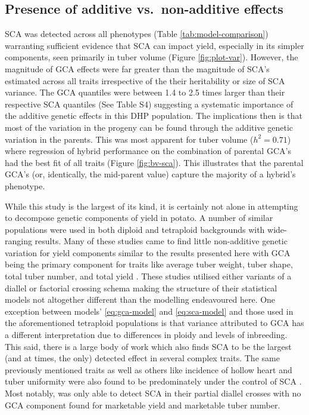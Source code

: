 \subsection{Presence of additive vs.~non-additive effects}\label{presence-of-additive-vs.-non-additive-effects}

SCA was detected across all phenotypes (Table \ref{tab:model-comparison}) warranting sufficient evidence that SCA can impact yield, especially in its simpler components, seen primarily in tuber volume (Figure \ref{fig:plot-var}). However, the magnitude of GCA effects were far greater than the magnitude of SCA's estimated across all traits irrespective of the their heritability or size of SCA variance. The GCA quantiles were between 1.4 to 2.5 times larger than their respective SCA quantiles (See Table S4) suggesting a systematic importance of the additive genetic effects in this DHP population. The implications then is that most of the variation in the progeny can be found through the additive genetic variation in the parents. This was most apparent for tuber volume (\(h^2 = 0.71\)) where regression of hybrid performance on the combination of parental GCA's had the best fit of all traits (Figure \ref{fig:bv-sca}). This illustrates that the parental GCA's (or, identically, the mid-parent value) capture the majority of a hybrid's phenotype.

While this study is the largest of its kind, it is certainly not alone in attempting to decompose genetic components of yield in potato. A number of similar populations were used in both diploid and tetraploid backgrounds with wide-ranging results. Many of these studies came to find little non-additive genetic variation for yield components similar to the results presented here with GCA being the primary component for traits like average tuber weight, tuber shape, total tuber number, and total yield \citep{Veilleux1981, Brown1989, Neele1991}. These studies utilised either variants of a diallel or factorial crossing schema making the structure of their statistical models not altogether different than the modelling endeavoured here. One exception between models' \eqref{eq:gca-model} and \eqref{eq:sca-model} and those used in the aforementioned tetraploid populations is that variance attributed to GCA has a different interpretation due to differences in ploidy and levels of inbreeding. This said, there is a large body of work which also finds SCA to be the largest (and at times, the only) detected effect in several complex traits. The same previously mentioned traits as well as others like incidence of hollow heart and tuber uniformity were also found to be predominately under the control of SCA \citep{Killick1977, Veilleux1981, Thompson1984, Haynes2001}. Most notably, \citep{Tai1976} was only able to detect SCA in their partial diallel crosses with no GCA component found for marketable yield and marketable tuber number.

